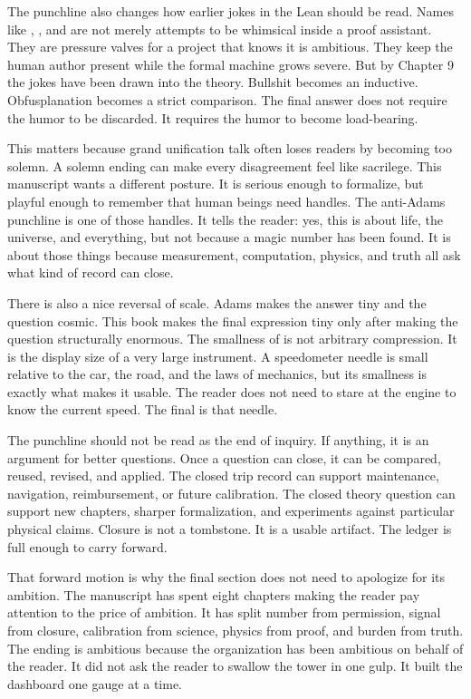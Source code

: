 The punchline also changes how earlier jokes in the Lean should be read. Names
like , , and  are not merely
attempts to be whimsical inside a proof assistant. They are pressure valves
for a project that knows it is ambitious. They keep the human author present
while the formal machine grows severe. But by Chapter 9 the jokes have been
drawn into the theory. Bullshit becomes an inductive. Obfusplanation becomes
a strict comparison. The final answer does not require the humor to be
discarded. It requires the humor to become load-bearing.

This matters because grand unification talk often loses readers by becoming
too solemn. A solemn ending can make every disagreement feel like sacrilege.
This manuscript wants a different posture. It is serious enough to formalize,
but playful enough to remember that human beings need handles. The anti-Adams
punchline is one of those handles. It tells the reader: yes, this is about
life, the universe, and everything, but not because a magic number has been
found. It is about those things because measurement, computation, physics, and
truth all ask what kind of record can close.

There is also a nice reversal of scale. Adams makes the answer tiny and the
question cosmic. This book makes the final expression tiny only after making
the question structurally enormous. The smallness of  is
not arbitrary compression. It is the display size of a very large instrument.
A speedometer needle is small relative to the car, the road, and the laws of
mechanics, but its smallness is exactly what makes it usable. The reader does
not need to stare at the engine to know the current speed. The final
 is that needle.

The punchline should not be read as the end of inquiry. If anything, it is an
argument for better questions. Once a question can close, it can be compared,
reused, revised, and applied. The closed trip record can support maintenance,
navigation, reimbursement, or future calibration. The closed theory question
can support new chapters, sharper formalization, and experiments against
particular physical claims. Closure is not a tombstone. It is a usable
artifact. The ledger is full enough to carry forward.

That forward motion is why the final section does not need to apologize for
its ambition. The manuscript has spent eight chapters making the reader pay
attention to the price of ambition. It has split number from permission,
signal from closure, calibration from science, physics from proof, and burden
from truth. The ending is ambitious because the organization has been
ambitious on behalf of the reader. It did not ask the reader to swallow the
tower in one gulp. It built the dashboard one gauge at a time.

